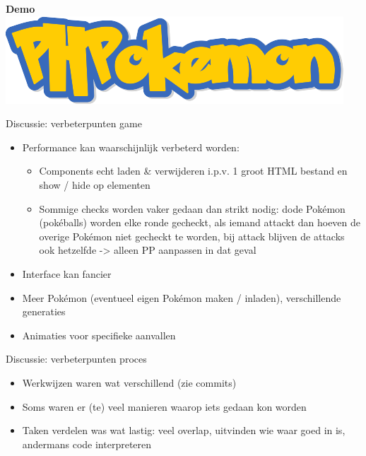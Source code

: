 \documentclass{beamer}
\begin{document}
\begin{frame}[focus]
	\textbf{{\huge Demo}} \\
	\bigskip
	\includegraphics[scale=0.4]{Images/PHPokemon.png}
\end{frame}


\begin{frame}{Discussie: verbeterpunten game}
	\begin{itemize}
		\item Performance kan waarschijnlijk verbeterd worden: 
			\begin{itemize}
				\item Components echt laden \& verwijderen i.p.v. 1 groot HTML bestand en show / hide op elementen
				\item Sommige checks worden vaker gedaan dan strikt nodig: dode Pokémon (pokéballs) worden elke ronde gecheckt, als iemand attackt dan hoeven de overige Pokémon niet gecheckt te worden, bij attack blijven de attacks ook hetzelfde -> alleen PP aanpassen in dat geval
			\end{itemize}
		\item Interface kan fancier
		\item Meer Pokémon (eventueel eigen Pokémon maken / inladen), verschillende generaties
		\item Animaties voor specifieke aanvallen
	\end{itemize}
\end{frame}


\begin{frame}{Discussie: verbeterpunten proces}
	\begin{itemize}
		\item Werkwijzen waren wat verschillend (zie commits)
		\item Soms waren er (te) veel manieren waarop iets gedaan kon worden
		\item Taken verdelen was wat lastig: veel overlap, uitvinden wie waar goed in is, andermans code interpreteren
	\end{itemize}
\end{frame}
\end{document}
